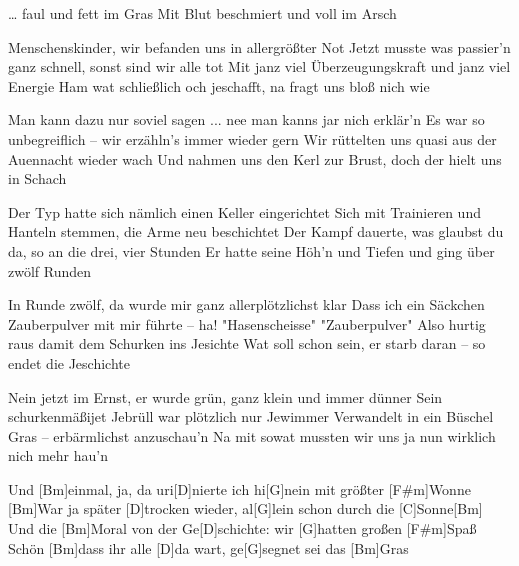 \begin{guitar}
	… faul und fett im Gras
	Mit Blut beschmiert und voll im Arsch
	
	Menschenskinder, wir befanden uns in allergrößter Not
	Jetzt musste was passier'n ganz schnell, sonst sind wir alle tot
	Mit janz viel Überzeugungskraft und janz viel Energie
	Ham wat schließlich och jeschafft, na fragt uns bloß nich wie
	
	Man kann dazu nur soviel sagen ... nee man kanns jar nich erklär'n
	Es war so unbegreiflich – wir erzähln's immer wieder gern
	Wir rüttelten uns quasi aus der Auennacht wieder wach
	Und nahmen uns den Kerl zur Brust, doch der hielt uns in Schach
	
	Der Typ hatte sich nämlich einen Keller eingerichtet
	Sich mit Trainieren und Hanteln stemmen, die Arme neu beschichtet
	Der Kampf dauerte, was glaubst du da, so an die drei, vier Stunden
	Er hatte seine Höh'n und Tiefen und ging über zwölf Runden
	
	In Runde zwölf, da wurde mir ganz allerplötzlichst klar
	Dass ich ein Säckchen Zauberpulver mit mir führte – ha!
	"Hasenscheisse" "Zauberpulver"
	Also hurtig raus damit dem Schurken ins Jesichte
	Wat soll schon sein, er starb daran – so endet die Jeschichte
	
	Nein jetzt im Ernst, er wurde grün, ganz klein und immer dünner
	Sein schurkenmäßijet Jebrüll war plötzlich nur Jewimmer
	Verwandelt in ein Büschel Gras – erbärmlichst anzuschau'n
	Na mit sowat mussten wir uns ja nun wirklich nich mehr hau'n
	
	Und [Bm]einmal, ja, da uri[D]nierte ich hi[G]nein mit größter [F#m]Wonne
	[Bm]War ja später [D]trocken wieder, al[G]lein schon durch die [C]Sonne[Bm]{}
	Und die [Bm]Moral von der Ge[D]schichte: wir [G]hatten großen [F#m]Spaß
	Schön [Bm]dass ihr alle [D]da wart, ge[G]segnet sei das [Bm]Gras
\end{guitar}